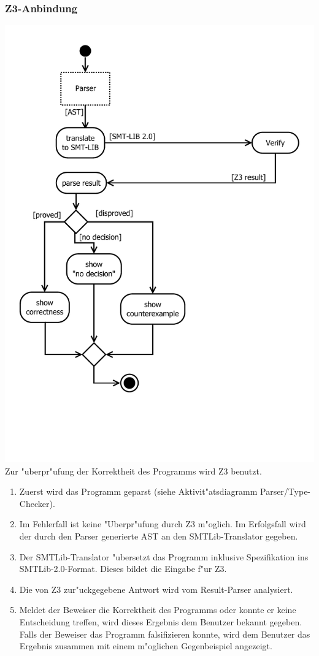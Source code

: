 \documentclass[10pt,a4paper,titlepage]{article}
\begin{document}
\subsubsection{Z3-Anbindung}
\includegraphics[scale=0.6]{images/AktivitaetSMTTranslator.pdf}\\
Zur "uberpr"ufung der Korrektheit des Programms wird Z3 benutzt. \\
\begin{enumerate}
\item Zuerst wird das Programm geparst (siehe Aktivit"atsdiagramm Parser/Type-Checker). 
\item Im Fehlerfall ist keine "Uberpr"ufung durch Z3 m"oglich. Im Erfolgsfall wird der durch den Parser generierte AST an den SMTLib-Translator gegeben. 
\item Der SMTLib-Translator "ubersetzt das Programm inklusive Spezifikation ins SMTLib-2.0-Format. Dieses bildet die Eingabe f"ur Z3.
\item Die von Z3 zur"uckgegebene Antwort wird vom Result-Parser analysiert. 
\item Meldet der Beweiser die Korrektheit des Programms oder konnte er keine Entscheidung treffen, wird dieses Ergebnis dem Benutzer bekannt gegeben. Falls der Beweiser das Programm falsifizieren konnte, wird dem Benutzer das Ergebnis zusammen mit einem m"oglichen Gegenbeispiel angezeigt.
\end{enumerate}
\end{document}
